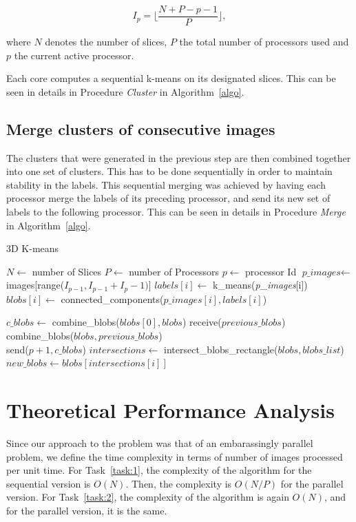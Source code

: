 \documentclass[a4paper,12pt]{article}
\begin{document}
			\begin{equation}
			I_p = \lfloor{\frac{N + P - p - 1}{P}}\rfloor,
			\end{equation}
			
where $N$ denotes the number of slices, $P$ the total number of processors used and $p$ the current active processor.

Each core computes a sequential k-means on its designated slices. This can be seen in details in Procedure \textit{Cluster} in Algorithm~\ref{algo}.
\subsection{Merge clusters of consecutive images}
The clusters that were generated in the previous step are then combined together into one set of clusters. This has to be done sequentially in order to maintain stability in the labels. This sequential merging was achieved by having each processor merge the labels of its preceding processor, and send its new set of labels to the following processor. This can be seen in details in Procedure \textit{Merge} in Algorithm~\ref{algo}.
		\begin{algorithm}
			\caption{3D K-means}\label{algo}
			\begin{algorithmic}[1]
				\State $N \gets$ number of Slices
				\State $P \gets$ number of Processors
				\State $p \gets$ processor Id
				\State $\textit{p\_images} \gets $images[range($I_{p - 1}, I_{p - 1}+I_p - 1)$]$ $
				\State $labels[i] \gets$ k\_means(\textit{p\_images}[i])
				\State $blobs[i] \gets$ connected\_components($p\_images[i], labels[i]$)
				\EndFor
			
				\EndProcedure
				
				\State $c\_blobs \gets$ combine\_blobs($blobs[0], blobs$)
					\State receive($previous\_blobs$)
					\State combine\_blobs($blobs, previous\_blobs$)\\
				\EndIf
					\State send($p+1, c\_blobs$)
				\EndProcedure
				\State $intersections \gets$ intersect\_blobs\_rectangle($blobs, blobs\_list$)
					\State $new\_blobs \gets blobs[intersections[i]]$
				\EndFor
				\EndProcedure
			\end{algorithmic}
		\end{algorithm}
		
		
\section{Theoretical Performance Analysis}
Since our approach to the problem was that of an embarassingly parallel problem, we define the time complexity in terms of number of images processed per unit time. For Task~\ref{task:1}, the complexity of the algorithm for the sequential version is $O(N)$. Then, the complexity is $O(N/P)$ for the parallel version. For Task~\ref{task:2}, the complexity of the algorithm is again $O(N)$, and for the parallel version, it is the same.
	
\end{document}
